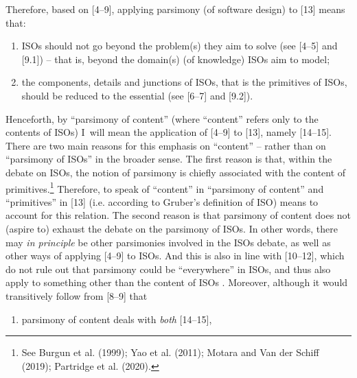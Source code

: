 Therefore, based on [4–9], applying parsimony (of software design) to [13] means that:



\begin{enumerate}

\item ISOs should not go beyond the problem(s) they aim to solve (see [4–5] and [9.1]) -- that is, beyond the domain(s) (of knowledge) ISOs aim to model;

\item the components, details and junctions of ISOs, that is the primitives of ISOs, should be reduced to the essential (see [6–7] and [9.2]).

\end{enumerate}

Henceforth, by ``parsimony of content'' (where ``content'' refers only to the contents of ISOs) I~will mean the application of [4–9] to [13], namely [14–15]. There are two main reasons for this emphasis on ``content'' -- rather than on ``parsimony of ISOs'' in the broader sense. The first reason is that, within the debate on ISOs, the notion of parsimony is chiefly associated with the content of primitives.\footnote{\textrm{ See Burgun et al. }\label{ref:RNDVwq8XaiFhH}\textrm{(1999)}\textrm{; Yao et al. }\label{ref:RNDLNiZPaJvJH}\textrm{(2011)}\textrm{; Motara and Van der Schiff }\label{ref:RNDOkvKiog8MQ}\textrm{(2019)}\textrm{; Partridge et al. }\label{ref:RND3xHRAkVhXC}\textrm{(2020)}\textrm{.}} Therefore, to speak of ``content'' in ``parsimony of content'' and ``primitives'' in [13] (i.e. according to Gruber's definition of ISO) means to account for this relation. The second reason is that parsimony of content does not (aspire to) exhaust the debate on the parsimony of ISOs. In other words, there may \textit{in principle} be other parsimonies involved in the ISOs debate, as well as other ways of applying [4–9] to ISOs. And this is also in line with [10–12], which do not rule out that parsimony could be ``everywhere'' in ISOs, and thus also apply to something other than the content of ISOs 
\parencite[][pp.161–167]{turner_computational_2018}. %
 Moreover, although it would transitively follow from [8–9] that



\setcounter{saveenum}{\value{enumi}}

\begin{enumerate}

\setcounter{enumi}{\value{saveenum}}

\item parsimony of content deals with \textit{both} [14–15],

\end{enumerate}

